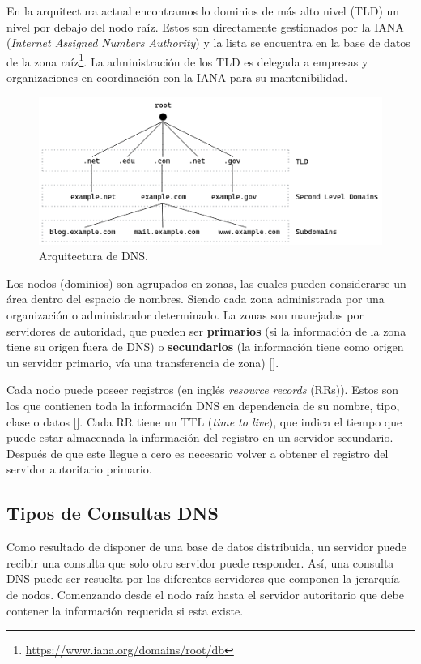 En la arquitectura actual encontramos lo dominios de más alto nivel (TLD) un nivel por debajo del nodo raíz. Estos son directamente gestionados por la IANA (\textit{Internet Assigned Numbers Authority}) y la lista se encuentra en la base de datos de la zona raíz\footnote{\url{https://www.iana.org/domains/root/db}}. La administración de los TLD es delegada a empresas y organizaciones en coordinación con la IANA para su mantenibilidad.

\begin{figure}[!ht]
    \centering
    \includegraphics[width=\linewidth]{draws/dns-arch.png}
    \caption{Arquitectura de DNS.}
\end{figure}

Los nodos (dominios) son agrupados en zonas, las cuales pueden considerarse un área dentro del espacio de nombres. Siendo cada zona administrada por una organización o administrador determinado. La zonas son manejadas por servidores de autoridad, que pueden ser \textbf{primarios} (si la información de la zona tiene su origen fuera de DNS) o \textbf{secundarios} (la información tiene como origen un servidor primario, vía una transferencia de zona) [\cite{Vixie_2007}].

Cada nodo puede poseer registros (en inglés \textit{resource records} (RRs)). Estos son los que contienen toda la información DNS en dependencia de su nombre, tipo, clase o datos [\cite{rfc_1035}]. Cada RR tiene un TTL (\textit{time to live}), que indica el tiempo que puede estar almacenada la información del registro en un servidor secundario. Después de que este llegue a cero es necesario volver a obtener el registro del servidor autoritario primario.

\subsection{Tipos de Consultas DNS}

Como resultado de disponer de una base de datos distribuida, un servidor puede recibir una consulta que solo otro servidor puede responder. Así, una consulta DNS puede ser resuelta por los diferentes servidores que componen la jerarquía de nodos. Comenzando desde el nodo raíz hasta el servidor autoritario que debe contener la información requerida si esta existe.

